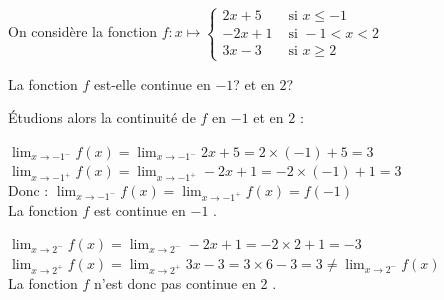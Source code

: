 \documentclass[11pt,a4paper]{article}  %
\begin{document}
	\graphicspath{{images/}}
	
	\begin{center}
		
	\end{center}
%	


On considère la fonction $f: x \mapsto \begin{cases}2 x+5 & \text { si } x \leqslant-1 \\ -2 x+1 & \text { si }-1<x<2  \\ 3x-3 & \text { si } x \geqslant 2\end{cases}$

La fonction $f$ est-elle continue en $-1$? et en $2$?

\begin{corrBox}
	Étudions alors la continuité de \(f\) en $-1$ et en $2$ :
	
	\begin{itemMet}
		\item \(\lim _{x \rightarrow -1^{-}} f(x)=\lim _{x \rightarrow -1^{-}}2x+5=2\times (-1)+5=3\)\\
		\(\lim _{x \rightarrow -1^{+}} f(x)=\lim _{x \rightarrow -1^{+}} -2x+1=-2\times (-1)+1=3\)\\
		Donc : \(\lim _{x \rightarrow -1^{-}} f(x)=\lim _{x \rightarrow -1^{+}} f(x)=f(-1)\)\\
		La fonction \(f\) est continue en $-1$ .
		\item \(\lim _{x \rightarrow 2^{-}} f(x)=\lim _{x \rightarrow 2^{-}} -2x+1=-2\times 2+1=-3\)\\
		\(\lim _{x \rightarrow 2^{+}} f(x)=\lim _{x \rightarrow 2^{+}}3x-3=3 \times 6-3=3\neq\lim _{x \rightarrow 2^{-}} f(x)\)\\
		La fonction \(f\) n'est donc pas continue en 2 .\\
	\end{itemMet}	
\end{corrBox}
\end{document}
